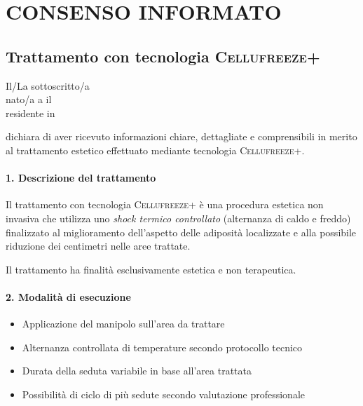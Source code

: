 
\section*{CONSENSO INFORMATO}

\subsection*{Trattamento con tecnologia \textsc{Cellufreeze+}}

\noindent
Il/La sottoscritto/a \underline{\hspace{5cm}} \\
nato/a a \underline{\hspace{3cm}} il \underline{\hspace{3cm}} \\
residente in \underline{\hspace{8cm}}

\noindent
dichiara di aver ricevuto informazioni chiare, dettagliate e comprensibili in merito al trattamento estetico effettuato mediante tecnologia \textsc{Cellufreeze+}.

\paragraph*{1. Descrizione del trattamento}
Il trattamento con tecnologia \textsc{Cellufreeze+} è una procedura estetica non invasiva che utilizza uno \emph{shock termico controllato} (alternanza di caldo e freddo) finalizzato al miglioramento dell’aspetto delle adiposità localizzate e alla possibile riduzione dei centimetri nelle aree trattate.

Il trattamento ha finalità esclusivamente estetica e non terapeutica.

\paragraph*{2. Modalità di esecuzione}
\begin{itemize}
    \item Applicazione del manipolo sull’area da trattare
    \item Alternanza controllata di temperature secondo protocollo tecnico
    \item Durata della seduta variabile in base all’area trattata
    \item Possibilità di ciclo di più sedute secondo valutazione professionale
\end{itemize}


